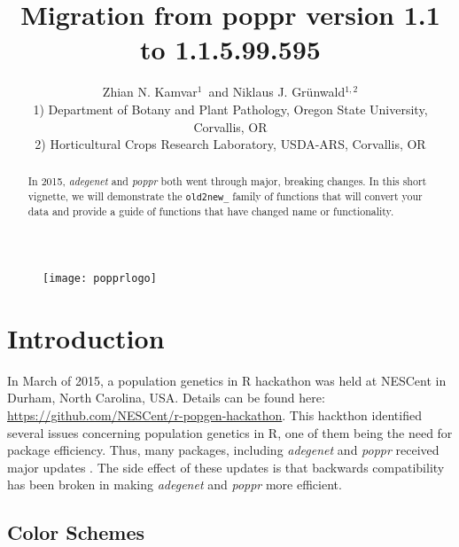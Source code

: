 \documentclass[letterpaper]{article}\usepackage[]{graphicx}\usepackage[]{color}
\title{Migration from poppr version 1.1 to 1.1.5.99.595}
\author{Zhian N. Kamvar$^{1}$\ and Niklaus J. Gr\"unwald$^{1,2}$\\\scriptsize{1)
Department of Botany and Plant Pathology, Oregon State University, Corvallis,
OR}\\\scriptsize{2) Horticultural Crops Research Laboratory, USDA-ARS,
Corvallis, OR}}
\newcommand{\poppr}{\textit{poppr}}
\newcommand{\Poppr}{\textit{Poppr}}
\newcommand{\adegenet}{\textit{adegenet}}
\begin{document}






\maketitle 
\begin{abstract} 
In 2015, \adegenet{} and \poppr{} both went through major, breaking changes.
In this short vignette, we will demonstrate the \texttt{old2new\_} family of
functions that will convert your data and provide a guide of functions that have
changed name or functionality. 
\end{abstract} 

\begin{figure}[b]   
  \centering
  \label{logo}   
  \texttt{[image: popprlogo]} 
\end{figure} 

\newpage 
\begingroup
  \hypersetup{linkcolor=black} 
  \tableofcontents 
\endgroup 

\section{Introduction}

In March of 2015, a population genetics in R hackathon was held at NESCent in 
Durham, North Carolina, USA. Details can be found here: 
\url{https://github.com/NESCent/r-popgen-hackathon}. This hackthon identified 
several issues concerning population genetics in R, one of them being the need
for package efficiency. Thus, many packages, including \adegenet{} and \poppr{}
received major updates \cite{kamvar2015novel}. The side effect of these updates 
is that backwards compatibility has been broken in making \adegenet{} and 
\poppr{} more efficient.

\subsection{Color Schemes}
\end{document}
